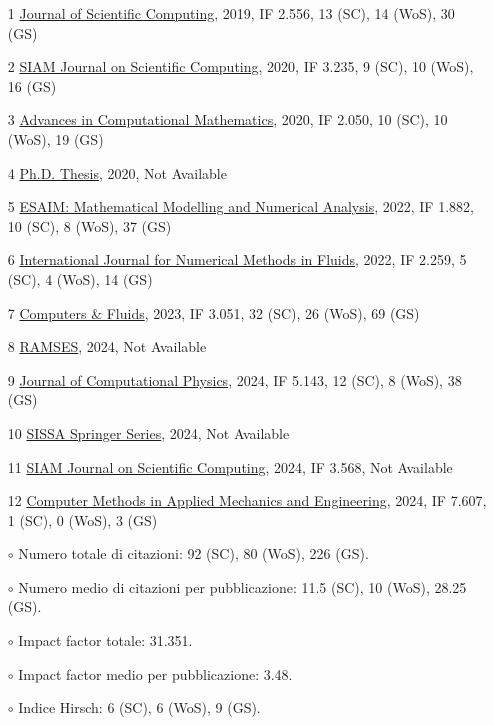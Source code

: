 \documentclass[
  usegeometry%
]{scrartcl}
\begin{document}
\begin{cv}{}
{\begin{itemize}
    \item[1] \underline{Journal of Scientific Computing},  2019,  IF 2.556,  13 (SC), 14 (WoS), 30 (GS)
    \item[2] \underline{SIAM Journal on Scientific Computing},  2020,  IF 3.235,  9 (SC), 10 (WoS), 16 (GS)
    \item[3] \underline{Advances in Computational Mathematics},  2020,  IF 2.050,  10 (SC), 10 (WoS), 19 (GS)
    \item[4] \underline{Ph.D. Thesis},  2020,  Not Available
    \item[5] \underline{ESAIM: Mathematical Modelling and Numerical Analysis},  2022,  IF 1.882,  10 (SC), 8 (WoS), 37 (GS) 
    \item[6]  \underline{International Journal for Numerical Methods in Fluids},  2022,  IF 2.259,  5 (SC), 4 (WoS), 14 (GS)
    \item[7]   \underline{Computers \& Fluids},  2023, IF 3.051,  32 (SC), 26 (WoS), 69 (GS)
    \item[8] \underline{RAMSES},  2024, Not Available
    \item[9]  \underline{Journal of Computational Physics},  2024,  IF 5.143,  12 (SC), 8 (WoS), 38 (GS)
    \item[10] \underline{SISSA Springer Series},  2024, Not Available
    \item[11] \underline{SIAM Journal on Scientific Computing},  2024,  IF 3.568, Not Available
    \item[12] \underline{Computer Methods in Applied Mechanics and Engineering},  2024,  IF 7.607,  1 (SC), 0 (WoS), 3 (GS)
\end{itemize}

\vspace{0.5cm}
\begin{itemize}
    \item[$\circ$] Numero totale di citazioni: 92 (SC), 80 (WoS), 226 (GS).
    \item[$\circ$] Numero medio di citazioni per pubblicazione: 11.5 (SC), 10 (WoS), 28.25 (GS).
    \item[$\circ$] Impact factor totale: 31.351.
    \item[$\circ$] Impact factor medio per pubblicazione: 3.48.
    \item[$\circ$] Indice Hirsch: 6 (SC), 6 (WoS), 9 (GS).
\end{itemize}}




\end{cv}
\end{document}
